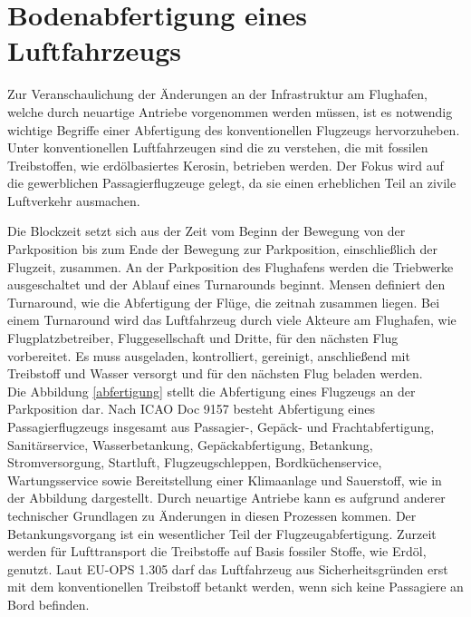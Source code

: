\section{Bodenabfertigung eines Luftfahrzeugs}
\label{s:Bodenabfertigung eines Luftfahrzeugs}

Zur Veranschaulichung der Änderungen an der Infrastruktur am Flughafen, 
welche durch neuartige Antriebe vorgenommen werden müssen, ist es notwendig 
wichtige Begriffe einer Abfertigung des konventionellen Flugzeugs hervorzuheben. 
Unter konventionellen Luftfahrzeugen sind die zu verstehen,
die mit fossilen Treibstoffen, wie erdölbasiertes Kerosin, betrieben werden. 
Der Fokus wird auf die gewerblichen Passagierflugzeuge gelegt,
da sie einen erheblichen Teil an zivile Luftverkehr ausmachen. %

Die Blockzeit setzt sich aus der Zeit vom Beginn der Bewegung von der Parkposition 
bis zum Ende der Bewegung zur Parkposition, einschließlich der Flugzeit, zusammen.
An der Parkposition des Flughafens werden die Triebwerke ausgeschaltet 
und der Ablauf eines Turnarounds beginnt. 
Mensen \cite{mensen2013handbuch} definiert den Turnaround, 
wie die Abfertigung der Flüge, die zeitnah zusammen liegen. %
Bei einem Turnaround wird das Luftfahrzeug durch viele Akteure am Flughafen, 
wie Flugplatzbetreiber, Fluggesellschaft und Dritte, für den nächsten Flug vorbereitet. 
Es muss ausgeladen, kontrolliert, gereinigt, anschließend mit Treibstoff und Wasser versorgt %
und für den nächsten Flug beladen werden.\\

Die Abbildung \ref{abfertigung} stellt die Abfertigung eines Flugzeugs an der Parkposition dar.
Nach ICAO Doc 9157 besteht Abfertigung eines Passagierflugzeugs 
insgesamt aus Passagier-, Gepäck- und Frachtabfertigung, Sanitärservice, Wasserbetankung, 
Gepäckabfertigung, Betankung, Stromversorgung, Startluft, Flugzeugschleppen, 
Bordküchenservice, Wartungsservice sowie Bereitstellung einer Klimaanlage und Sauerstoff,
wie in der Abbildung dargestellt. Durch neuartige Antriebe kann es aufgrund anderer 
technischer Grundlagen zu Änderungen in diesen Prozessen kommen.
%
Der Betankungsvorgang ist ein wesentlicher Teil der Flugzeugabfertigung. 
Zurzeit werden für Lufttransport die Treibstoffe auf Basis fossiler Stoffe, wie Erdöl, genutzt. 
Laut EU-OPS 1.305 darf das Luftfahrzeug aus Sicherheitsgründen erst mit dem konventionellen Treibstoff betankt werden, 
wenn sich keine Passagiere an Bord befinden. 
%

